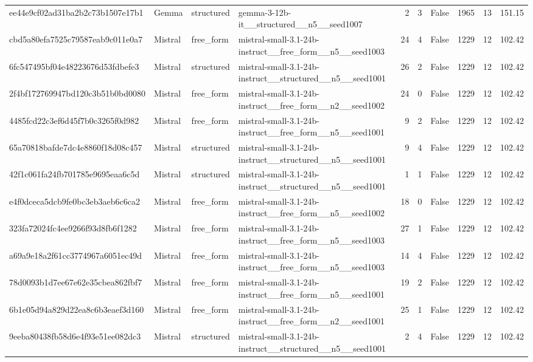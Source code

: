 \begin{longtable}{llllrrrrrr}
ee44e9cf02ad31ba2b2c73b1507e17b1 & Gemma & structured & gemma-3-12b-it\_\_structured\_\_n5\_\_seed1007 & 2 & 3 & False & 1965 & 13 & 151.15 \\
cbd5a80efa7525c79587eab9c011e0a7 & Mistral & free\_form & mistral-small-3.1-24b-instruct\_\_free\_form\_\_n5\_\_seed1003 & 24 & 4 & False & 1229 & 12 & 102.42 \\
6fc547495bf04e48223676d53fdbefe3 & Mistral & structured & mistral-small-3.1-24b-instruct\_\_structured\_\_n5\_\_seed1001 & 26 & 2 & False & 1229 & 12 & 102.42 \\
2f4bf172769947bd120c3b51b0bd0080 & Mistral & free\_form & mistral-small-3.1-24b-instruct\_\_free\_form\_\_n2\_\_seed1002 & 24 & 0 & False & 1229 & 12 & 102.42 \\
4485fcd22c3ef6d45f7b0c3265f0d982 & Mistral & free\_form & mistral-small-3.1-24b-instruct\_\_free\_form\_\_n5\_\_seed1001 & 9 & 2 & False & 1229 & 12 & 102.42 \\
65a70818bafde7dc4e8860f18d08c457 & Mistral & structured & mistral-small-3.1-24b-instruct\_\_structured\_\_n5\_\_seed1001 & 9 & 4 & False & 1229 & 12 & 102.42 \\
42f1c061fa24fb701785e9695eaa6c5d & Mistral & structured & mistral-small-3.1-24b-instruct\_\_structured\_\_n5\_\_seed1001 & 1 & 1 & False & 1229 & 12 & 102.42 \\
e4f0dceca5dcb9fe0bc3eb3aeb6c6ca2 & Mistral & free\_form & mistral-small-3.1-24b-instruct\_\_free\_form\_\_n5\_\_seed1002 & 18 & 0 & False & 1229 & 12 & 102.42 \\
323fa72024fc4ee9266f93d8fb6f1282 & Mistral & free\_form & mistral-small-3.1-24b-instruct\_\_free\_form\_\_n5\_\_seed1003 & 27 & 1 & False & 1229 & 12 & 102.42 \\
a69a9e18a2f61cc3774967a6051ec49d & Mistral & free\_form & mistral-small-3.1-24b-instruct\_\_free\_form\_\_n5\_\_seed1003 & 14 & 4 & False & 1229 & 12 & 102.42 \\
78d0093b1d7ee67e62e35cbea862fbf7 & Mistral & free\_form & mistral-small-3.1-24b-instruct\_\_free\_form\_\_n5\_\_seed1001 & 19 & 2 & False & 1229 & 12 & 102.42 \\
6b1e05d94a829d22ea8c6b3eaef3d160 & Mistral & free\_form & mistral-small-3.1-24b-instruct\_\_free\_form\_\_n2\_\_seed1001 & 25 & 1 & False & 1229 & 12 & 102.42 \\
9eeba80438fb58d6e4f93e51ee082dc3 & Mistral & structured & mistral-small-3.1-24b-instruct\_\_structured\_\_n5\_\_seed1001 & 2 & 4 & False & 1229 & 12 & 102.42 \\

\end{longtable}
